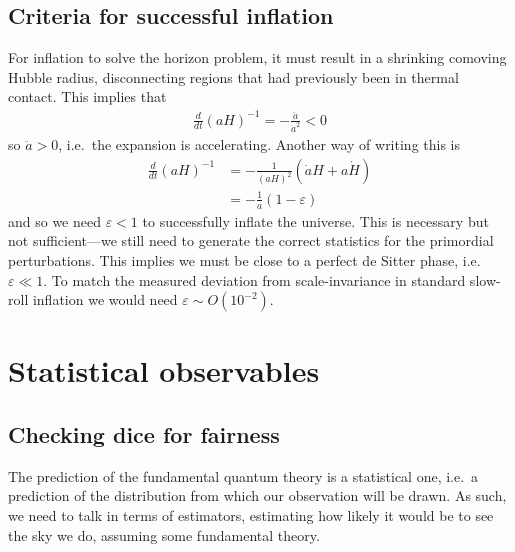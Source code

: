     \subsection{Criteria for successful inflation}
    For inflation to solve the horizon problem, it must result in a shrinking comoving
    Hubble radius, disconnecting regions that had previously been in thermal contact.
    This implies that
    \begin{align}
        \frac{d}{dt}\left(aH\right)^{-1} = -\frac{\ddot{a}}{\dot{a}^2} < 0
    \end{align}
    so $\ddot{a}>0$, i.e.\ the expansion is accelerating. Another way of writing this is
    \begin{align}
        \frac{d}{dt}\left(aH\right)^{-1} &= -\frac{1}{(aH)^2}\left(\dot{a}H+a\dot{H}\right)\\
            &= -\frac{1}{a}\left(1-\varepsilon\right)
    \end{align}
    and so we need $\varepsilon<1$ to successfully inflate the universe.
    This is necessary but not sufficient---we still need to generate
    the correct statistics for the primordial perturbations.
    This implies we must be close to a perfect de Sitter phase, i.e.\ $\varepsilon\ll1$.
    To match the measured deviation from scale-invariance in standard slow-roll
    inflation we would need $\varepsilon\sim O(10^{-2})$.
\newpage
\section{Statistical observables}
    \subsection{Checking dice for fairness}
    The prediction of the fundamental quantum theory is a statistical one,
    i.e.\ a prediction of the distribution from which our observation will be drawn.
    As such, we need to talk in terms of estimators, estimating how likely it
    would be to see the sky we do, assuming some fundamental theory.


